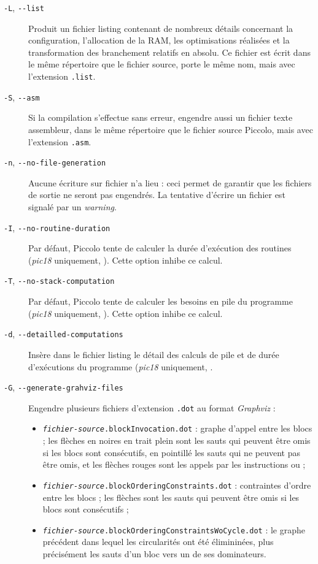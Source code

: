 \begin{description}
  \item[\texttt{-L}, \texttt{-{-}list}] Produit un fichier listing contenant de nombreux détails concernant la configuration, l’allocation de la RAM, les optimisations réalisées et la transformation des branchement relatifs en absolu. Ce fichier est écrit dans le même répertoire que le fichier source, porte le même nom, mais avec l’extension \texttt{.list}.

  \item[\texttt{-S}, \texttt{-{-}asm}] Si la compilation s’effectue sans erreur, engendre aussi un fichier texte assembleur, dans le même répertoire que le fichier source Piccolo, mais avec l’extension \texttt{.asm}.

  \item[\texttt{-n}, \texttt{-{-}no-file-generation}] Aucune écriture sur fichier n’a lieu : ceci permet de garantir que les fichiers de sortie ne seront pas engendrés. La tentative d’écrire un fichier est signalé par un \emph{warning}.

  \item[\texttt{-I}, \texttt{-{-}no-routine-duration}] Par défaut, Piccolo tente de calculer la durée d'exécution des routines (\emph{pic18} uniquement, ). Cette option inhibe ce calcul.

  \item[\texttt{-T}, \texttt{-{-}no-stack-computation}] Par défaut, Piccolo tente de calculer les besoins en pile du programme (\emph{pic18} uniquement, ). Cette option inhibe ce calcul.

  \item[\texttt{-d}, \texttt{-{-}detailled-computations}] Insère dans le fichier listing le détail des calculs de pile et de durée d'exécutions du programme (\emph{pic18} uniquement, .

  \item[\texttt{-G}, \texttt{-{-}generate-grahviz-files}] Engendre plusieurs fichiers d'extension \texttt{.dot} au format \emph{Graphviz} :
\begin{itemize}
\item \texttt{\emph{fichier-source}.blockInvocation.dot} : graphe d'appel entre les blocs ; les flèches en noires en trait plein sont les sauts qui peuvent être omis si les blocs sont consécutifs, en pointillé les sauts qui ne peuvent pas être omis, et les flèches rouges sont les appels par les instructions  ou  ; 
\item \texttt{\emph{fichier-source}.blockOrderingConstraints.dot} : contraintes d'ordre entre les blocs ; les flèches sont les sauts qui peuvent être omis si les blocs sont consécutifs ; 
\item \texttt{\emph{fichier-source}.blockOrderingConstraintsWoCycle.dot} : le graphe précédent dans lequel les circularités ont été élimininées, plus précisément les sauts d'un bloc vers un de ses dominateurs. 
\end{itemize}


\end{description}
